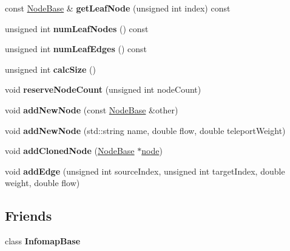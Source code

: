 \begin{DoxyCompactItemize}
\item 
\mbox{\label{classTreeData_a512e6694542f62b7e67f47f8afc37eeb}} 
const \mbox{\hyperlink{classNodeBase}{Node\+Base}} \& {\bfseries get\+Leaf\+Node} (unsigned int index) const
\item 
\mbox{\label{classTreeData_a0e93d369c15f31a481b69cc8580754d4}} 
unsigned int {\bfseries num\+Leaf\+Nodes} () const
\item 
\mbox{\label{classTreeData_ab1c320bcbcece7452562ff2c11342d46}} 
unsigned int {\bfseries num\+Leaf\+Edges} () const
\item 
\mbox{\label{classTreeData_a953594879b5f3e6dd22ffe1a662749e8}} 
unsigned int {\bfseries calc\+Size} ()
\item 
\mbox{\label{classTreeData_a2a62f94ac79c6a522689ad7b7525569c}} 
void {\bfseries reserve\+Node\+Count} (unsigned int node\+Count)
\item 
\mbox{\label{classTreeData_a6be4531a047646f870f9add5eedd1c5f}} 
void {\bfseries add\+New\+Node} (const \mbox{\hyperlink{classNodeBase}{Node\+Base}} \&other)
\item 
\mbox{\label{classTreeData_a3de20d8637cf3292fc04b2b1fcf59421}} 
void {\bfseries add\+New\+Node} (std\+::string name, double flow, double teleport\+Weight)
\item 
\mbox{\label{classTreeData_abf420385ac7256aa4b05f0124386ce62}} 
void {\bfseries add\+Cloned\+Node} (\mbox{\hyperlink{classNodeBase}{Node\+Base}} $\ast$\mbox{\hyperlink{structnode}{node}})
\item 
\mbox{\label{classTreeData_aa1f268197e475a1e1fff17fc7f20bd58}} 
void {\bfseries add\+Edge} (unsigned int source\+Index, unsigned int target\+Index, double weight, double flow)
\end{DoxyCompactItemize}
\subsection*{Friends}
\begin{DoxyCompactItemize}
\item 
\mbox{\label{classTreeData_ad8700eb06c8de0a40db2ef52849adac1}} 
class {\bfseries Infomap\+Base}
\end{DoxyCompactItemize}


